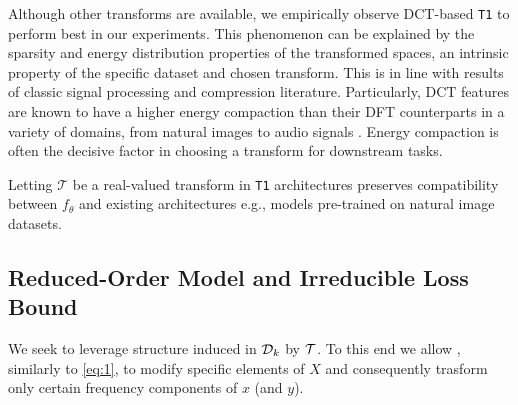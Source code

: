 Although other transforms are available, we empirically observe DCT-based {\tt T1} to perform best in our experiments. This phenomenon can be explained by the sparsity and energy distribution properties of the transformed spaces, an intrinsic property of the specific dataset and chosen transform. This is in line with results of classic signal processing and compression literature. Particularly, DCT features are known to have a higher energy compaction than their DFT counterparts in a variety of domains, from natural images \citep{yaroslavsky2014fast} to audio signals \citep{soon1998noisy}. Energy compaction is often the decisive factor in choosing a transform for downstream tasks.  

Letting $\mathcal{T}$ be a real-valued transform in {\tt T1} architectures preserves compatibility between $f_{\theta}$ and existing architectures e.g., models pre-trained on natural image datasets. 


\subsection{Reduced-Order \ourmethod{} Model and Irreducible Loss Bound}\label{subsec:inverse}

We seek to leverage structure induced in $\mathcal{D}_k$ by $\mathcal{T}$. To this end we allow \ourmethod{}, similarly to \eqref{eq:1}, to modify specific elements of $X$ and consequently trasform only certain frequency components of $x$ (and $y$). 
%

